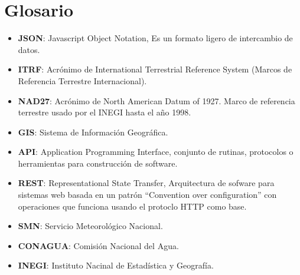 \newpage
\section*{Glosario}
\begin{itemize}
	\item \textbf{JSON}: Javascript Object Notation, Es un formato ligero de intercambio de datos.
	\item \textbf{ITRF}: Acrónimo de International Terrestrial Reference System (Marcos de Referencia Terrestre Internacional).
	\item \textbf{NAD27}: Acrónimo de North American Datum of 1927. Marco de referencia terrestre usado por el INEGI hasta el año 1998.
	\item \textbf{GIS}: Sistema de Información Geográfica.
  \item \textbf{API}: Application Programming Interface, conjunto de rutinas, protocolos o herramientas para construcción de software.
  \item \textbf{REST}: Representational State Transfer, Arquitectura de sofware para sistemas web basada en un patrón ``Convention over configuration'' con operaciones que funciona usando el protoclo HTTP como base.
  \item \textbf{SMN}: Servicio Meteorológico Nacional.
  \item \textbf{CONAGUA}: Comisión Nacional del Agua.
  \item \textbf{INEGI}: Instituto Nacinal de Estadística y Geografía.
\end{itemize}
